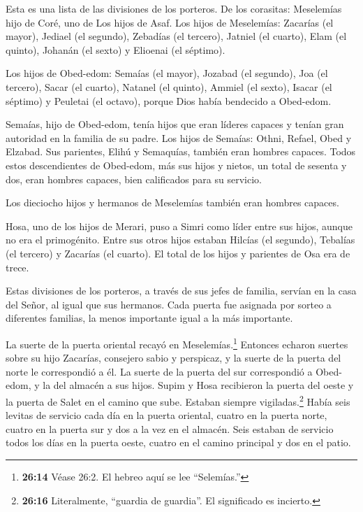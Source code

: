  Esta es una lista de las divisiones de los porteros. De los
corasitas: Meselemías hijo de Coré, uno de Los hijos de Asaf.
 Los hijos de Meselemías: Zacarías (el mayor), Jediael (el
segundo), Zebadías (el tercero), Jatniel (el cuarto),  Elam
(el quinto), Johanán (el sexto) y Elioenai (el séptimo).

 Los hijos de Obed-edom: Semaías (el mayor), Jozabad (el
segundo), Joa (el tercero), Sacar (el cuarto), Natanel (el quinto),
 Ammiel (el sexto), Isacar (el séptimo) y Peuletai (el
octavo), porque Dios había bendecido a Obed-edom.

 Semaías, hijo de Obed-edom, tenía hijos que eran líderes
capaces y tenían gran autoridad en la familia de su padre. 
Los hijos de Semaías: Othni, Refael, Obed y Elzabad. Sus parientes,
Elihú y Semaquías, también eran hombres capaces.  Todos
estos descendientes de Obed-edom, más sus hijos y nietos, un total de
sesenta y dos, eran hombres capaces, bien calificados para su servicio.

 Los dieciocho hijos y hermanos de Meselemías también eran
hombres capaces.

 Hosa, uno de los hijos de Merari, puso a Simri como líder
entre sus hijos, aunque no era el primogénito.  Entre sus
otros hijos estaban Hilcías (el segundo), Tebalías (el tercero) y
Zacarías (el cuarto). El total de los hijos y parientes de Osa era de
trece.

 Estas divisiones de los porteros, a través de sus jefes de
familia, servían en la casa del Señor, al igual que sus hermanos.
 Cada puerta fue asignada por sorteo a diferentes familias,
la menos importante igual a la más importante.

 La suerte de la puerta oriental recayó en
Meselemías.\footnote{\textbf{26:14} Véase 26:2. El hebreo aquí se lee
  ``Selemías.''} Entonces echaron suertes sobre su hijo Zacarías,
consejero sabio y perspicaz, y la suerte de la puerta del norte le
correspondió a él.  La suerte de la puerta del sur
correspondió a Obed-edom, y la del almacén a sus hijos. 
Supim y Hosa recibieron la puerta del oeste y la puerta de Salet en el
camino que sube. Estaban siempre vigiladas.\footnote{\textbf{26:16}
  Literalmente, ``guardia de guardia''. El significado es incierto.}
 Había seis levitas de servicio cada día en la puerta
oriental, cuatro en la puerta norte, cuatro en la puerta sur y dos a la
vez en el almacén.  Seis estaban de servicio todos los días
en la puerta oeste, cuatro en el camino principal y dos en el patio.


